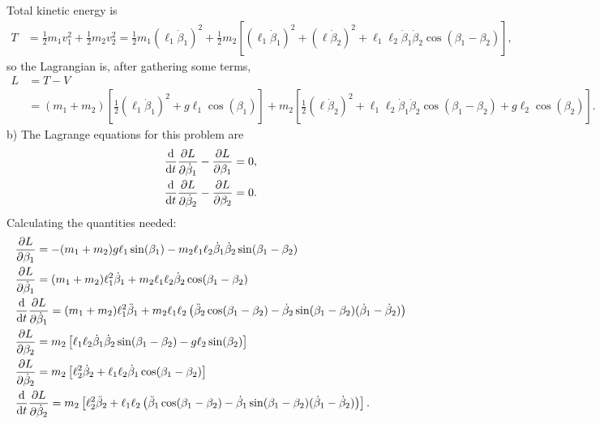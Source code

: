 \documentclass{article}
\begin{document}
        Total kinetic energy is
        \begin{align*}            
            T &= \frac{1}{2}m_1 v_1^2 + \frac{1}{2}m_2 v_2^2 = \frac{1}{2}m_1 (\ell_1 \dot \beta_1)^2 + \frac{1}{2}m_2 \left[ (\ell_1 \dot \beta_1)^2+  (\ell \dot \beta_2)^2 + \ell_1 \ell_2 \dot \beta_1 \dot \beta_2 \cos(\beta_1 - \beta_2)\right],
        \end{align*}
        so the Lagrangian is, after gathering some terms, 
        \begin{align*}
            L &= T - V  \\
            &= (m_1 + m_2) \left[\frac{1}{2}(\ell_1 \dot \beta_1)^2 + g \ell_1 \cos(\beta_1)  \right] 
            + m_2 \left[\frac{1}{2} (\ell \dot \beta_2)^2 + \ell_1 \ell_2 \dot \beta_1 \dot \beta_2 \cos(\beta_1 - \beta_2) + g \ell_2 \cos(\beta_2)\right].
        \end{align*}
        b) The Lagrange equations for this problem are
        \begin{align*}
            & \dv{t} \pdv{L}{\dot \beta_1} - \pdv{L}{\beta_1} = 0, \\
            & \dv{t} \pdv{L}{\dot \beta_2} - \pdv{L}{\beta_2} = 0.
        \end{align*}
        Calculating the quantities needed:
        \begin{align*}
            & \pdv{L}{\beta_1} = -(m_1 + m_2) g \ell_1 \sin(\beta_1) - m_2 \ell_1 \ell_2 \dot \beta_1 \dot \beta_2 \sin(\beta_1 - \beta_2) \\
            & \pdv{L}{\dot \beta_1} = (m_1 + m_2) \ell_1^2 \dot \beta_1 + m_2 \ell_1 \ell_2 \dot \beta_2 \cos(\beta_1 - \beta_2) \\
            & \dv{t} \pdv{L}{\dot \beta_1} = (m_1 + m_2) \ell_1^2 \ddot \beta_1 + m_2 \ell_1 \ell_2 \left( \ddot \beta_2 \cos(\beta_1 - \beta_2) - \dot \beta_2 \sin(\beta_1 - \beta_2)(\dot \beta_1 - \dot \beta_2) \right)\\
            & \pdv{L}{\beta_2} =  m_2 \left[ \ell_1 \ell_2 \dot \beta_1 \dot \beta_2 \sin(\beta_1 - \beta_2)  - g \ell_2 \sin(\beta_2)\right]\\
            & \pdv{L}{\dot \beta_2} = m_2 \left[\ell_2^2 \dot \beta_2 + \ell_1 \ell_2 \dot \beta_1 \cos(\beta_1 - \beta_2)\right] \\
            & \dv{t} \pdv{L}{\dot \beta_2} = m_2 \left[ \ell_2^2 \ddot \beta_2 + \ell_1 \ell_2 \left(\ddot \beta_1\cos(\beta_1 - \beta_2) - \dot \beta_1 \sin(\beta_1 - \beta_2) (\dot \beta_1 - \dot \beta_2)\right) \right].
        \end{align*}
\end{document}
